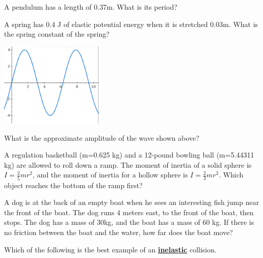 \documentclass[10pt]{examdesign}
\begin{document}
\begin{multiplechoice} [title={Multiple Choice (3 Points Each)},
	rearrange=yes]
\begin{question}
	A pendulum has a length of 0.37m.  What is its period?
\end{question}


\begin{question}
	A spring has 0.4 J of elastic potential energy when it is stretched 0.03m.  What is the spring constant of the spring?
\end{question}


\begin{block}
		\includegraphics[height=4cm]{wave2.png}
	
\begin{question}
	What is the approximate amplitude of the wave shown above?
	\end{question}

\end{block}


\begin{question}
A regulation basketball (m=0.625 kg) and a 12-pound bowling ball (m=5.44311 kg) are allowed to roll down a ramp.  The moment of inertia of a solid sphere is $I = \frac{2}{5} mr^2$, and the moment of inertia for a hollow sphere is $I = \frac{2}{3} mr^2$.  Which object reaches the bottom of the ramp first?
\end{question}



\begin{question}
	A dog is at the back of an empty boat when he sees an interesting fish jump near the front of the boat.  The dog runs 4 meters east, to the front of the boat, then stops.  The dog has a mass of 30kg, and the boat has a mass of 60 kg.  If there is no friction between the boat and the water, how far does the boat move? 
\end{question}


	\begin{question}
	Which of the following is the best example of an \textbf{\underline{inelastic}} collision.
\end{question}
\end{multiplechoice}
\end{document}
